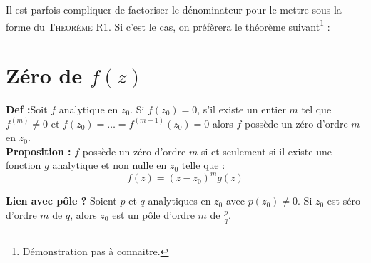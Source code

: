 	Il est parfois compliquer de factoriser le dénominateur pour le mettre sous la forme
	du \textsc{Theorème R1}. Si c'est le cas, on préfèrera le théorème suivant\footnote{
	Démonstration pas à connaitre.} :\\
	

\section{Zéro de $f(z)$}
\textbf{Def :}Soit $f$ analytique en $z_0$. Si $f(z_0) = 0$, s'il existe un entier $m$ tel que
$f^{(m)}\neq 0$ et $f(z_0) = \dots = f^{(m-1)}(z_0) = 0$ alors $f$ possède un 
zéro d'ordre $m$ en $z_0$.\\

\textbf{Proposition :} $f$ possède un zéro d'ordre $m$ si et seulement si il existe une fonction $g$ analytique et non nulle en $z_0$ telle que :
\begin{equation}
f(z) = (z-z_0)^mg(z)
\end{equation}

\textbf{Lien avec pôle ?} Soient $p$ et $q$ analytiques en $z_0$ avec $p(z_0)\neq 0$. Si
$z_0$ est séro d'ordre $m$ de $q$, alors $z_0$ est un pôle d'ordre $m$ de $\frac{p}{q}$.

